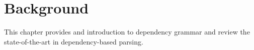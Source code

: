 \chapter{Background}
\label{chap:background}

This chapter provides and introduction to dependency grammar and review the state-of-the-art in 
dependency-based parsing. 
